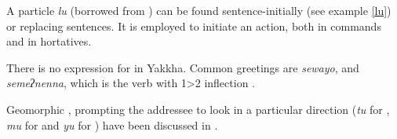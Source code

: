  
 
A particle \emph{lu} (borrowed from ) can be  found sentence-initially (see example \ref{lu}) or replacing sentences. It is employed to initiate an action, both in commands and in hortatives.

 There is no expression for  in Yakkha. Common greetings are \emph{sewayo}, and \emph{semeʔnenna}, which is the verb  with 1>2 inflection . 

Geomorphic , prompting the addressee to look in a particular direction (\emph{tu} for , \emph{mu} for  and \emph{yu} for ) have been  discussed in .  
  

  
 

